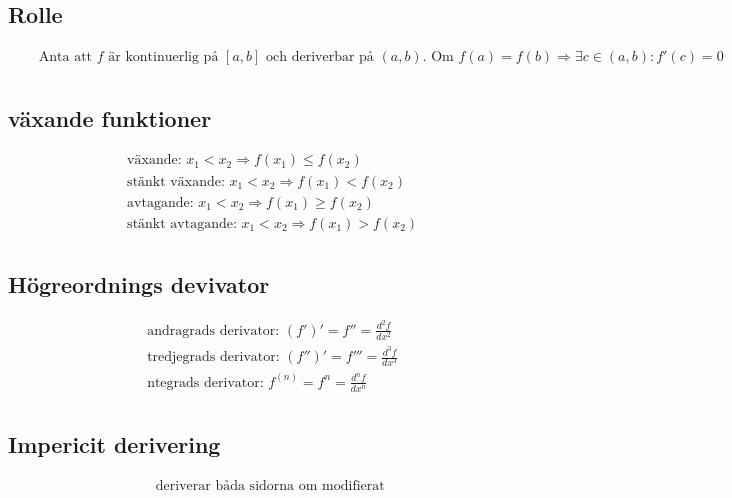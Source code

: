 \subsection{Rolle} 
\begin{align*}
  &\quad  \text{Anta att $f$ är kontinuerlig på $[a,b]$ och deriverbar på $(a,b)$. Om } f(a)=f(b) \Rightarrow
  \exists c \in (a,b):f'(c)=0 \\
\end{align*}


\newpage


\subsection{växande funktioner}
\begin{align*}
  &\quad  \text{växande: }          x_1<x_2 \Rightarrow f(x_1) \leq f(x_2) \\
  &\quad  \text{stänkt växande: }   x_1<x_2 \Rightarrow f(x_1) < f(x_2)    \\
  &\quad  \text{avtagande: }        x_1<x_2 \Rightarrow f(x_1) \geq f(x_2) \\
  &\quad  \text{stänkt avtagande: } x_1<x_2 \Rightarrow f(x_1) > f(x_2)    \\
\end{align*}


\subsection{Högreordnings devivator}
\begin{align*}
  &\quad  \text{andragrads derivator: }  (f')' = f''  =\frac{d^2f}{dx^2} \\
  &\quad  \text{tredjegrads derivator: } (f'')'= f''' =\frac{d^3f}{dx^3} \\
  &\quad  \text{ntegrads derivator: }    f^{(n)}= f^{n}=\frac{d^{n}f}{dx^{n}} \\
\end{align*}


\subsection{Impericit derivering}
\begin{align*}
  &\quad  \text{deriverar båda sidorna om modifierat } \\
\end{align*}

